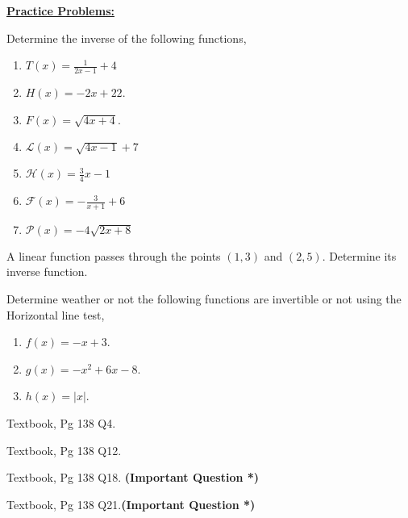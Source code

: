 \documentclass[12pt]{article} %
\begin{document}
\textbf{\underline{\Large{Practice Problems:}}}
\begin{qstn}
  Determine the inverse of the following functions,
  \begin{enumerate}[label=(\alph*)]
    \item $T(x) = \frac{1}{2x - 1} + 4$
    \item $H(x) = -2x + 22$.
    \item $F(x) = \sqrt{4x + 4}$.
    \item $\mathcal{L}(x) = \sqrt{4x - 1} + 7$
    \item $\mathcal{H}(x) = \frac{3}{4}x - 1$
    \item $\mathcal{F}(x) = -\frac{3}{x + 1} + 6$
    \item $\mathcal{P}(x) = -4\sqrt{2x + 8}$
  \end{enumerate}
\end{qstn}

\begin{qstn}
  A linear function passes through the points $(1,3)$ and $(2,5)$. Determine its inverse function.
\end{qstn}

\begin{qstn}
  Determine weather or not the following functions are invertible or not using the Horizontal line test,
  \begin{enumerate}[label=(\alph*)]
    \item $f(x) = -x + 3$.
    \item $g(x) = -x^2 + 6x - 8$.
    \item $h(x) = \left|x\right|$.
  \end{enumerate}
\end{qstn}

\begin{qstn}
  Textbook, Pg 138 Q4.
\end{qstn}

\begin{qstn}
  Textbook, Pg 138 Q12.
\end{qstn}

\begin{qstn}
  Textbook, Pg 138 Q18. \textbf{(Important Question *)}
\end{qstn}

\begin{qstn}
  Textbook, Pg 138 Q21.\textbf{(Important Question *)}
\end{qstn}


\newpage
\end{document}
